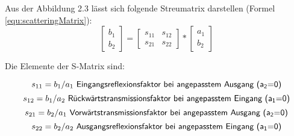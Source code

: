 Aus der Abbildung 2.3 lässt sich folgende Streumatrix darstellen (Formel \ref{equ:scatteringMatrix}):
\begin{equation}\label{equ:scatteringMatrix}
	\left[
		\begin{matrix}b_1 \\ b_2 \end{matrix}
	\right]
 	=
 	\left[
 		\begin{matrix}
			s_{11}&s_{12} \\s_{21}&s_{22}
		\end{matrix}
	\right]
	* 
	\left[
		\begin{matrix}
			a_1\\b_2
		\end{matrix}
	\right]
\end{equation}

Die Elemente der S-Matrix sind:

\begin{equation}\label{equ:def_s11}
	s_{11} = b_1/a_1\textsf{ Eingangsreflexionsfaktor bei angepasstem Ausgang (a\textsubscript{2}=0)}
\end{equation}
\begin{equation}\label{equ:def_s12}
	s_{12} = b_1/a_2\textsf{ Rückwärtstransmissionsfaktor bei angepasstem Eingang (a\textsubscript{1}=0)}
\end{equation}
\begin{equation}\label{equ:def_s21}
	s_{21} = b_2/a_1\textsf{ Vorwärtstransmissionsfaktor bei angepasstem Ausgang (a\textsubscript{2}=0)}
\end{equation}
\begin{equation}\label{equ:def_s22}
	s_{22} = b_2/a_2\textsf{ Ausgangsreflexionsfaktor bei angepasstem Eingang (a\textsubscript{1}=0)}
\end{equation}
\newpage